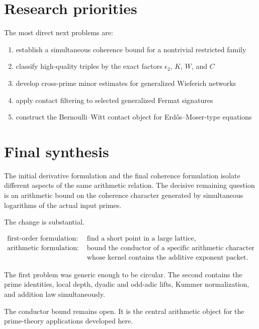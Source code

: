 \section{Research priorities}
The most direct next problems are:
\begin{enumerate}[leftmargin=1.5em]
\item establish a simultaneous coherence bound for a nontrivial restricted family
\item classify high-quality triples by the exact factors $\epsilon_2$, $K$, $W$, and $C$
\item develop cross-prime minor estimates for generalized Wieferich networks
\item apply contact filtering to selected generalized Fermat signatures
\item construct the Bernoulli--Witt contact object for Erd\H{o}s--Moser-type equations
\end{enumerate}

\section{Final synthesis}
The initial derivative formulation and the final coherence formulation isolate different aspects of the same arithmetic relation. The decisive remaining question is an arithmetic bound on the coherence character generated by simultaneous logarithms of the actual input primes.

The change is substantial.

\[
\boxed{
\begin{aligned}
\text{first-order formulation: }&\text{find a short point in a large lattice},\\
\text{arithmetic formulation: }&\text{bound the conductor of a specific arithmetic character}\\
&\text{whose kernel contains the additive exponent packet}.
\end{aligned}
}
\]

The first problem was generic enough to be circular. The second contains the prime identities, local depth, dyadic and odd-adic lifts, Kummer normalization, and addition law simultaneously.

The conductor bound remains open. It is the central arithmetic object for the prime-theory applications developed here.
